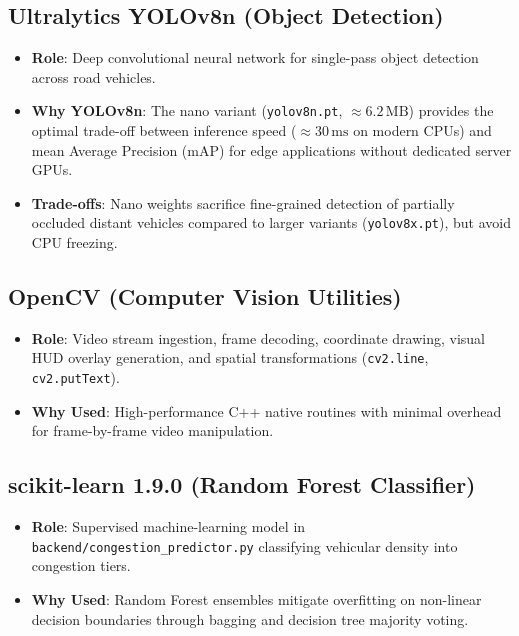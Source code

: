 \documentclass[11pt,a4paper,oneside]{report}
\begin{document}
\subsection{Ultralytics YOLOv8n (Object Detection)}
\begin{itemize}[leftmargin=*]
    \item \textbf{Role}: Deep convolutional neural network for single-pass object detection across road vehicles.
    \item \textbf{Why YOLOv8n}: The nano variant (\texttt{yolov8n.pt}, $\approx 6.2\,\text{MB}$) provides the optimal trade-off between inference speed ($\approx 30\,\text{ms}$ on modern CPUs) and mean Average Precision (mAP) for edge applications without dedicated server GPUs.
    \item \textbf{Trade-offs}: Nano weights sacrifice fine-grained detection of partially occluded distant vehicles compared to larger variants (\texttt{yolov8x.pt}), but avoid CPU freezing.
\end{itemize}

\subsection{OpenCV (Computer Vision Utilities)}
\begin{itemize}[leftmargin=*]
    \item \textbf{Role}: Video stream ingestion, frame decoding, coordinate drawing, visual HUD overlay generation, and spatial transformations (\texttt{cv2.line}, \texttt{cv2.putText}).
    \item \textbf{Why Used}: High-performance C++ native routines with minimal overhead for frame-by-frame video manipulation.
\end{itemize}

\subsection{scikit-learn 1.9.0 (Random Forest Classifier)}
\begin{itemize}[leftmargin=*]
    \item \textbf{Role}: Supervised machine-learning model in \texttt{backend/congestion\_predictor.py} classifying vehicular density into congestion tiers.
    \item \textbf{Why Used}: Random Forest ensembles mitigate overfitting on non-linear decision boundaries through bagging and decision tree majority voting.
\end{itemize}
\end{document}
